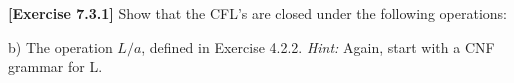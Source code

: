 \textbf{[Exercise 7.3.1]} Show that the CFL's are closed under the following 
operations:

b) The operation $L/a$, defined in Exercise 4.2.2. \textit{Hint:}
Again, start with a CNF grammar for L.